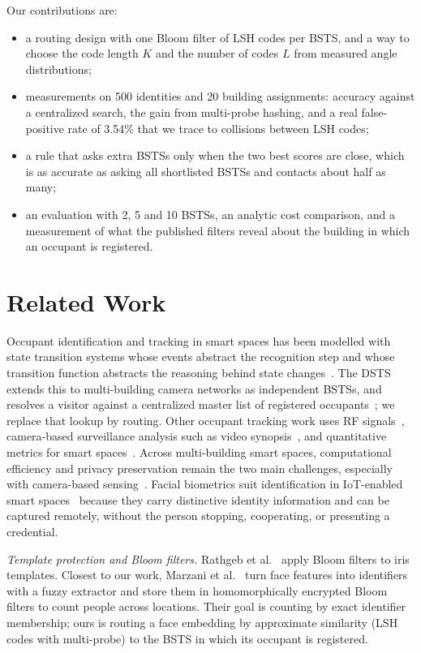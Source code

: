 \documentclass[pdflatex,sn-mathphys-num]{sn-jnl}%
\theoremstyle{thmstyleone}%
\theoremstyle{thmstyletwo}%
\theoremstyle{thmstylethree}%
\begin{document}
Our contributions are:
\begin{itemize}
\item a routing design with one Bloom filter of LSH codes per BSTS, and a way to choose the code length $K$ and the number of codes $L$ from measured angle distributions;
\item measurements on 500 identities and 20 building assignments: accuracy against a centralized search, the gain from multi-probe hashing, and a real false-positive rate of 3.54\% that we trace to collisions between LSH codes;
\item a rule that asks extra BSTSs only when the two best scores are close, which is as accurate as asking all shortlisted BSTSs and contacts about half as many;
\item an evaluation with 2, 5 and 10 BSTSs, an analytic cost comparison, and a measurement of what the published filters reveal about the building in which an occupant is registered.
\end{itemize}

\section{Related Work}
\label{sec:related}
Occupant identification and tracking in smart spaces has been modelled with state transition systems whose events abstract the recognition step and whose transition function abstracts the reasoning behind state changes~\cite{MJG2011}. The DSTS extends this to multi-building camera networks as independent BSTSs, and resolves a visitor against a centralized master list of registered occupants~\cite{mohan2020}; we replace that lookup by routing. Other occupant tracking work uses RF signals~\cite{WZSYGWLLHSC2025}, camera-based surveillance analysis such as video synopsis~\cite{NGA2022}, and quantitative metrics for smart spaces~\cite{MMJ2025}. Across multi-building smart spaces, computational efficiency and privacy preservation remain the two main challenges, especially with camera-based sensing~\cite{KKZWKMW2025}. Facial biometrics suit identification in IoT-enabled smart spaces~\cite{KZGS2024} because they carry distinctive identity information and can be captured remotely, without the person stopping, cooperating, or presenting a credential.

\emph{Template protection and Bloom filters.} Rathgeb et al.~\cite{rathgeb2014} apply Bloom filters to iris templates. Closest to our work, Marzani et al.~\cite{marzani2026} turn face features into identifiers with a fuzzy extractor and store them in homomorphically encrypted Bloom filters to count people across locations. Their goal is counting by exact identifier membership; ours is routing a face embedding by approximate similarity (LSH codes with multi-probe) to the BSTS in which its occupant is registered.
\end{document}
